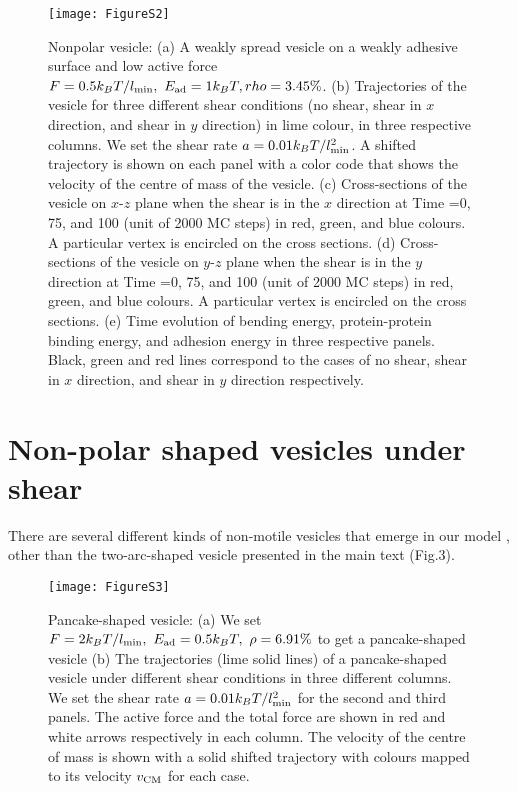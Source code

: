 \documentclass[aps,article,amsmath]{revtex4-2}
\begin{document}
\begin{figure}
    \centering
    \texttt{[image: FigureS2]}
\caption{Nonpolar vesicle: (a) A weakly spread vesicle on a weakly adhesive surface and low active force \cite{sadhu2021modelling} $F=0.5 k_BT/l_{\rm min},~E_{\rm ad}=1k_BT,rho=3.45\%$. (b) Trajectories of the vesicle for three different shear conditions (no shear, shear in $x$ direction, and shear in $y$ direction) in lime colour, in three respective columns. We set the shear rate $a=0.01 k_BT/l_{\rm min}^2$. A shifted trajectory is shown on each panel with a color code that shows the velocity of the centre of mass of the vesicle. (c) Cross-sections of the vesicle on $x$-$z$ plane when the shear is in the $x$ direction at Time =0, 75, and 100 (unit of 2000 MC steps) in red, green, and blue colours. A particular vertex is encircled on the cross sections. (d) Cross-sections of the vesicle on $y$-$z$ plane when the shear is in the $y$ direction at Time =0, 75, and 100 (unit of 2000 MC steps) in red, green, and blue colours. A particular vertex is encircled on the cross sections. (e) Time evolution of bending energy, protein-protein binding energy, and adhesion energy in three respective panels. Black, green and red lines correspond to the cases of no shear, shear in $x$ direction, and shear in $y$ direction respectively.}
    \label{fig:nonpolar2}
\end{figure}
\section{Non-polar shaped vesicles under shear}
There are several different kinds of non-motile vesicles that emerge in our model \cite{sadhu2021modelling}, other than the two-arc-shaped vesicle presented in the main text (Fig.3). 

\begin{figure}
    \centering
    \texttt{[image: FigureS3]}
    \caption{Pancake-shaped vesicle: (a) We set $F=2k_BT/l_{\rm min},~E_{\rm ad}=0.5k_BT, ~\rho=6.91\%$ to get a pancake-shaped vesicle \cite{sadhu2021modelling} (b) The trajectories (lime solid lines) of a pancake-shaped vesicle under different shear conditions in three different columns. We set the shear rate $a=0.01k_BT/l_{\rm min}^2$ for the second and third panels. The active force and the total force are shown in red and white arrows respectively in each column. The velocity of the centre of mass is shown with a solid shifted trajectory with colours mapped to its velocity $v_{\rm CM}$ for each case.}
    \label{fig:pancake}
\end{figure}
\end{document}
